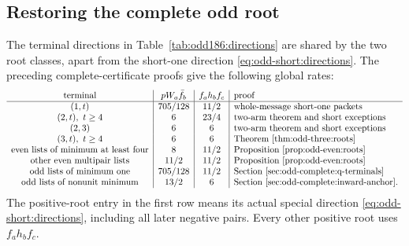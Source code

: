 \subsection{Restoring the complete odd root}
\label{sec:odd-complete:assembly}

The terminal directions in Table~\ref{tab:odd186:directions}
are shared by the two root classes, apart from the short-one
direction \eqref{eq:odd-short:directions}. The preceding
complete-certificate proofs give the following global rates:
\begin{equation}\label{eq:odd-complete:catalogue}
\begin{array}{c|c|c|l}
 \text{terminal}&pW_a\bar f_b&f_a h_bf_c&\text{proof}\\\hline
 (1,t)&705/128&11/2&\text{whole-message short-one packets}\\
 (2,t),\ t\ge4&6&23/4&\text{two-arm theorem and short exceptions}\\
 (2,3)&6&6&\text{two-arm theorem and short exceptions}\\
 (3,t),\ t\ge4&6&6&\text{Theorem~\ref{thm:odd-three:roots}}\\
 \text{even lists of minimum at least four}&8&11/2
          &\text{Proposition~\ref{prop:odd-even:roots}}\\
 \text{other even multipair lists}&11/2&11/2
          &\text{Proposition~\ref{prop:odd-even:roots}}\\
 \text{odd lists of minimum one}&705/128&11/2
          &\text{Section~\ref{sec:odd-complete:q-terminals}}\\
 \text{odd lists of nonunit minimum}&13/2&6
          &\text{Section~\ref{sec:odd-complete:inward-anchor}}.
\end{array}
\end{equation}
The positive-root entry in the first row means its actual special
direction \eqref{eq:odd-short:directions}, including all later
negative pairs. Every other positive root uses $f_a h_bf_c$.


